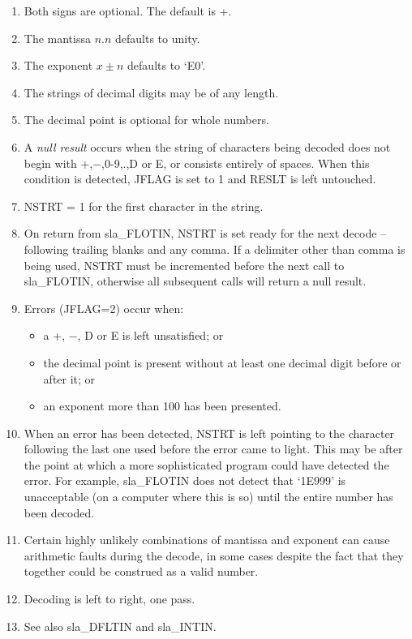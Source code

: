 \documentclass[11pt,twoside]{article}
\begin{document}
{\begin{enumerate}
       \begin{itemize}
       \item Any character other than +,$-$,0-9,.,D,E or space may be
             used to signal the end of the number and terminate decoding.
       \item Comma is recognized by sla\_FLOTIN as a special case; it
             is skipped, leaving the pointer on the next character.  See
             13, below.
       \item Decoding will in all cases terminate if end of string
             is reached.
       \end{itemize}
 \item Both signs are optional.  The default is +.
 \item The mantissa $n.n$ defaults to unity.
 \item The exponent $x\!\pm\!n$ defaults to `E0'.
 \item The strings of decimal digits may be of any length.
 \item The decimal point is optional for whole numbers.
 \item A {\it null result}\/ occurs when the string of characters
       being decoded does not begin with +,$-$,0-9,.,D or E, or
       consists entirely of spaces.  When this condition is
       detected, JFLAG is set to 1 and RESLT is left untouched.
 \item NSTRT = 1 for the first character in the string.
 \item On return from sla\_FLOTIN, NSTRT is set ready for the next
       decode -- following trailing blanks and any comma.  If a
       delimiter other than comma is being used, NSTRT must be
       incremented before the next call to sla\_FLOTIN, otherwise
       all subsequent calls will return a null result.
 \item Errors (JFLAG=2) occur when:
       \begin{itemize}
       \item a +, $-$, D or E is left unsatisfied; or
       \item the decimal point is present without at least
             one decimal digit before or after it; or
       \item an exponent more than 100 has been presented.
       \end{itemize}
 \item When an error has been detected, NSTRT is left
       pointing to the character following the last
       one used before the error came to light.  This
       may be after the point at which a more sophisticated
       program could have detected the error.  For example,
       sla\_FLOTIN does not detect that `1E999' is unacceptable
       (on a computer where this is so)
       until the entire number has been decoded.
 \item Certain highly unlikely combinations of mantissa and
       exponent can cause arithmetic faults during the
       decode, in some cases despite the fact that they
       together could be construed as a valid number.
 \item Decoding is left to right, one pass.
 \item See also sla\_DFLTIN and sla\_INTIN.
 \end{enumerate}
}
\end{document}
